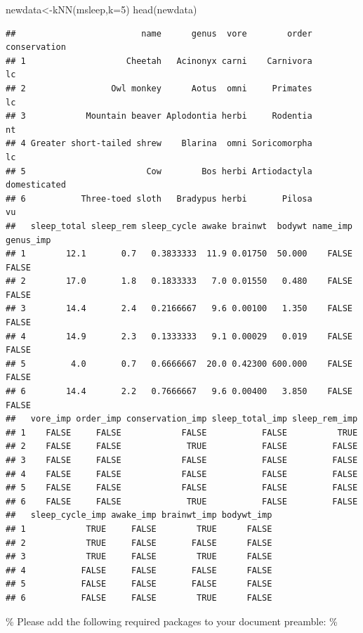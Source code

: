 \documentclass[
]{article}
\newenvironment{Shaded}{\begin{snugshade}}{\end{snugshade}}
\newcommand{\AttributeTok}[1]{\textcolor[rgb]{0.77,0.63,0.00}{#1}}
\newcommand{\DecValTok}[1]{\textcolor[rgb]{0.00,0.00,0.81}{#1}}
\newcommand{\FunctionTok}[1]{\textcolor[rgb]{0.00,0.00,0.00}{#1}}
\newcommand{\NormalTok}[1]{#1}
\newcommand{\OtherTok}[1]{\textcolor[rgb]{0.56,0.35,0.01}{#1}}
\begin{document}
\begin{Shaded}
\begin{Highlighting}[]
\NormalTok{newdata}\OtherTok{\textless{}{-}}\FunctionTok{kNN}\NormalTok{(msleep,}\AttributeTok{k=}\DecValTok{5}\NormalTok{)}
\FunctionTok{head}\NormalTok{(newdata)}
\end{Highlighting}
\end{Shaded}

\begin{verbatim}
##                         name      genus  vore        order conservation
## 1                    Cheetah   Acinonyx carni    Carnivora           lc
## 2                 Owl monkey      Aotus  omni     Primates           lc
## 3            Mountain beaver Aplodontia herbi     Rodentia           nt
## 4 Greater short-tailed shrew    Blarina  omni Soricomorpha           lc
## 5                        Cow        Bos herbi Artiodactyla domesticated
## 6           Three-toed sloth   Bradypus herbi       Pilosa           vu
##   sleep_total sleep_rem sleep_cycle awake brainwt  bodywt name_imp genus_imp
## 1        12.1       0.7   0.3833333  11.9 0.01750  50.000    FALSE     FALSE
## 2        17.0       1.8   0.1833333   7.0 0.01550   0.480    FALSE     FALSE
## 3        14.4       2.4   0.2166667   9.6 0.00100   1.350    FALSE     FALSE
## 4        14.9       2.3   0.1333333   9.1 0.00029   0.019    FALSE     FALSE
## 5         4.0       0.7   0.6666667  20.0 0.42300 600.000    FALSE     FALSE
## 6        14.4       2.2   0.7666667   9.6 0.00400   3.850    FALSE     FALSE
##   vore_imp order_imp conservation_imp sleep_total_imp sleep_rem_imp
## 1    FALSE     FALSE            FALSE           FALSE          TRUE
## 2    FALSE     FALSE             TRUE           FALSE         FALSE
## 3    FALSE     FALSE            FALSE           FALSE         FALSE
## 4    FALSE     FALSE            FALSE           FALSE         FALSE
## 5    FALSE     FALSE            FALSE           FALSE         FALSE
## 6    FALSE     FALSE             TRUE           FALSE         FALSE
##   sleep_cycle_imp awake_imp brainwt_imp bodywt_imp
## 1            TRUE     FALSE        TRUE      FALSE
## 2            TRUE     FALSE       FALSE      FALSE
## 3            TRUE     FALSE        TRUE      FALSE
## 4           FALSE     FALSE       FALSE      FALSE
## 5           FALSE     FALSE       FALSE      FALSE
## 6           FALSE     FALSE        TRUE      FALSE
\end{verbatim}

\% Please add the following required packages to your document preamble:
\%
\end{document}
